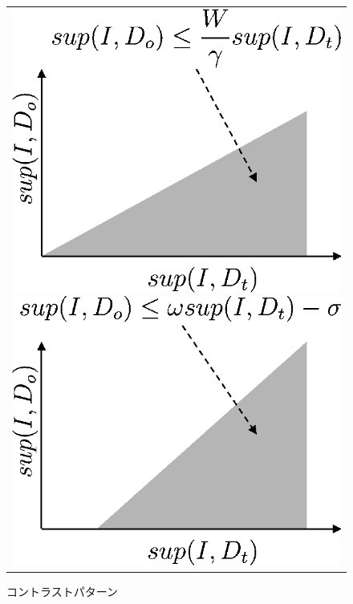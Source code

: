 \documentclass[a4paper]{jarticle}
\begin{document}
\begin{figure}[htbp]
\begin{center}
\begin{tabular}{c}

\begin{minipage}{0.3\hsize}
\begin{center}
\includegraphics[scale=0.5]{./ep.eps}
\caption{顕在パターン\label{fig:ep}}
\end{center}
\end{minipage}

\begin{minipage}{0.3\hsize}
\begin{center}
\includegraphics[scale=0.5]{./cp.eps}
\caption{コントラストパターン\label{fig:cp}}
\end{center}
\end{minipage}


\end{tabular}
\end{center}
\end{figure}
\end{document}
